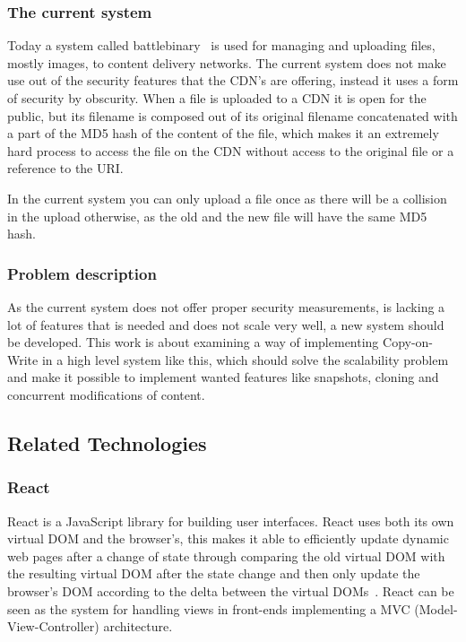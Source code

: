 \documentclass[a4paper,12pt]{article}
\begin{document}
\subsubsection{The current system}
Today a system called battlebinary~\cite{BATTLEBINARY} is used for managing and uploading files,
mostly images, to content delivery networks. The current system does not make use out of the
security features that the CDN's are offering, instead it uses a form of security by obscurity. When
a file is uploaded to a CDN it is open for the public, but its filename is composed out of its
original filename concatenated with a part of the MD5 hash of the content of the file, which makes
it an extremely hard process to access the file on the CDN without access to the original file or a
reference to the URI.

In the current system you can only upload a file once as there will be a collision in the upload
otherwise, as the old and the new file will have the same MD5 hash.  

\subsubsection{Problem description}
As the current system does not offer proper security measurements, is lacking a lot of features that
is needed and does not scale very well, a new system should be developed. This work is about
examining a way of implementing Copy-on-Write in a high level system like this, which should solve
the scalability problem and make it possible to implement wanted features like snapshots, cloning
and concurrent modifications of content.

\subsection{Related Technologies}
\subsubsection{React}
React is a JavaScript library for building user interfaces. React uses both its own virtual DOM and
the browser's, this makes it able to efficiently update dynamic web pages after a change of state
through comparing the old virtual DOM with the resulting virtual DOM after the state change and then
only update the browser's DOM according to the delta between the virtual DOMs~\cite{REACT}. React
can be seen as the system for handling views in front-ends implementing a MVC
(Model-View-Controller) architecture.
\end{document}
